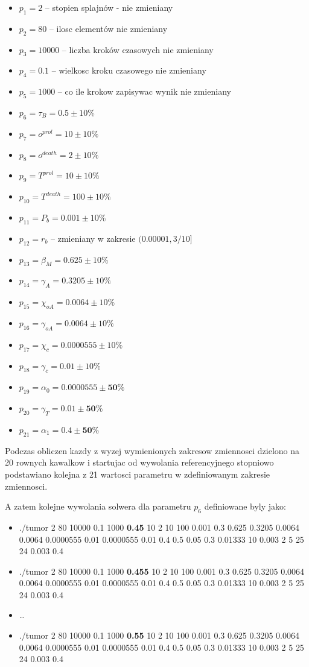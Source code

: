 \documentclass[]{article}
\providecommand{\tightlist}{%
  \setlength{\itemsep}{0pt}\setlength{\parskip}{0pt}}
\begin{document}
\begin{itemize}
\tightlist
\item
  \(p_1=2\) -- stopien splajnów - nie zmieniany
\item
  \(p_2=80\) -- ilosc elementów nie zmieniany
\item
  \(p_3=10000\) -- liczba kroków czasowych nie zmieniany
\item
  \(p_4=0.1\) -- wielkosc kroku czasowego nie zmieniany
\item
  \(p_5=1000\) -- co ile krokow zapisywac wynik nie zmieniany
\item
  \(p_6=\tau_B = 0.5 \pm 10\%\)
\item
  \(p_7=o^{prol} = 10 \pm 10\%\)
\item
  \(p_8=o^{death} = 2 \pm 10\%\)
\item
  \(p_9=T^{prol} = 10 \pm 10\%\)
\item
  \(p_{10}=T^{death} = 100 \pm 10\%\)
\item
  \(p_{11}=P_b = 0.001 \pm 10\%\)
\item
  \(p_{12}=r_b\) -- zmieniany w zakresie \((0.00001,3/10]\)
\item
  \(p_{13}=\beta_M = 0.625 \pm 10\%\)
\item
  \(p_{14}=\gamma_A = 0.3205 \pm 10\%\)
\item
  \(p_{15}=\chi_{oA} = 0.0064 \pm 10\%\)
\item
  \(p_{16}=\gamma_{oA} = 0.0064 \pm 10\%\)
\item
  \(p_{17}=\chi_c = 0.0000555 \pm 10\%\)
\item
  \(p_{18}=\gamma_c = 0.01 \pm 10\%\)
\item
  \(p_{19}=\alpha_0 = 0.0000555 \pm \textbf{50\%}\)
\item
  \(p_{20}=\gamma_T = 0.01 \pm \textbf{50\%}\)
\item
  \(p_{21}=\alpha_1 = 0.4 \pm \textbf{50\%}\)
\end{itemize}

Podczas obliczen kazdy z wyzej wymienionych zakresow zmiennosci dzielono
na 20 rownych kawalkow i startujac od wywolania referencyjnego stopniowo
podstawiano kolejna z 21 wartosci parametru w zdefiniowanym zakresie
zmiennosci.

A zatem kolejne wywolania solwera dla parametru \(p_6\) definiowane byly
jako:

\begin{itemize}
\tightlist
\item
  ./tumor 2 80 10000 0.1 1000 \textbf{0.45} 10 2 10 100 0.001 0.3 0.625
  0.3205 0.0064 0.0064 0.0000555 0.01 0.0000555 0.01 0.4 0.5 0.05 0.3
  0.01333 10 0.003 2 5 25 24 0.003 0.4
\item
  ./tumor 2 80 10000 0.1 1000 \textbf{0.455} 10 2 10 100 0.001 0.3 0.625
  0.3205 0.0064 0.0064 0.0000555 0.01 0.0000555 0.01 0.4 0.5 0.05 0.3
  0.01333 10 0.003 2 5 25 24 0.003 0.4
\item
  \ldots{}
\item
  ./tumor 2 80 10000 0.1 1000 \textbf{0.55} 10 2 10 100 0.001 0.3 0.625
  0.3205 0.0064 0.0064 0.0000555 0.01 0.0000555 0.01 0.4 0.5 0.05 0.3
  0.01333 10 0.003 2 5 25 24 0.003 0.4
\end{itemize}
\end{document}
